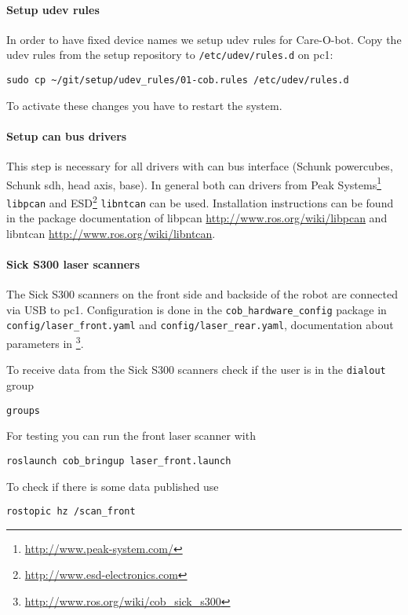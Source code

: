 \paragraph{Setup udev rules}
In order to have fixed device names we setup udev rules for Care-O-bot. Copy the udev rules from the setup repository to \texttt{/etc/udev/rules.d} on pc1:
\begin{lstlisting}
sudo cp ~/git/setup/udev_rules/01-cob.rules /etc/udev/rules.d
\end{lstlisting}
To activate these changes you have to restart the system.

\paragraph{Setup can bus drivers}
This step is necessary for all drivers with can bus interface (Schunk powercubes, Schunk sdh, head axis, base). In general both can drivers from Peak Systems\footnote{\url{http://www.peak-system.com/}} \texttt{libpcan} and ESD\footnote{\url{http://www.esd-electronics.com}} \texttt{libntcan} can be used. Installation instructions can be found in the package documentation of libpcan \url{http://www.ros.org/wiki/libpcan} and libntcan \url{http://www.ros.org/wiki/libntcan}.

\paragraph{Sick S300 laser scanners}
The Sick S300 scanners on the front side and backside of the robot are connected via USB to pc1. Configuration is done in the \texttt{cob\_hardware\_config} package in \texttt{config/laser\_front.yaml} and \texttt{config/laser\_rear.yaml}, documentation about parameters in \footnote{\url{http://www.ros.org/wiki/cob_sick_s300}}.

To receive data from the Sick S300 scanners check if the user is in the \texttt{dialout} group
\begin{lstlisting}
groups
\end{lstlisting}

For testing you can run the front laser scanner with
\begin{lstlisting}
roslaunch cob_bringup laser_front.launch
\end{lstlisting}

To check if there is some data published use
\begin{lstlisting}
rostopic hz /scan_front
\end{lstlisting}

